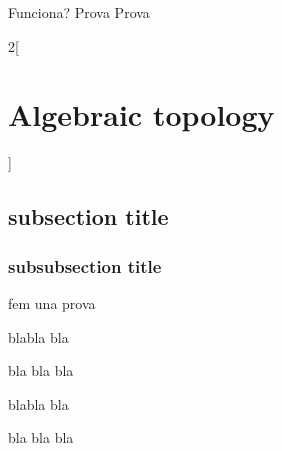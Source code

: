 \documentclass[../../../main.tex]{subfiles}
\begin{document}
\renewcommand{\col}{\geo}
Funciona? Prova Prova
\begin{multicols}{2}[\section{Algebraic topology}]
  \subsection{subsection title}
  \subsubsection{subsubsection title}
  \begin{definition}
    fem una prova
  \end{definition}
  \begin{theorem}
    blabla bla
  \end{theorem}
  \begin{lemma}
    bla bla bla
  \end{lemma}
  \begin{proposition}
    blabla bla
  \end{proposition}
  \begin{corollary}
    bla bla bla
  \end{corollary}
\end{multicols}
\end{document}
